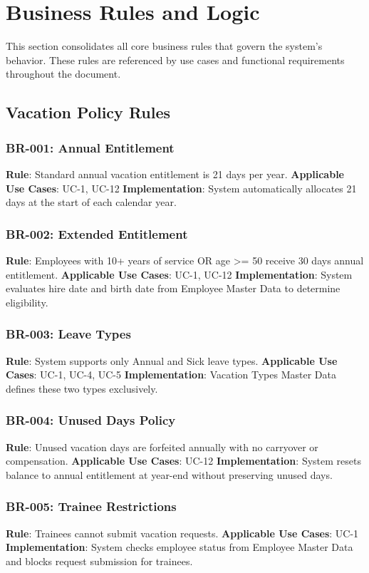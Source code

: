 \documentclass[12pt,a4paper]{article}
\begin{document}
\section{Business Rules and Logic}

This section consolidates all core business rules that govern the system's behavior. These rules are referenced by use cases and functional requirements throughout the document.

\subsection{Vacation Policy Rules}

\subsubsection{BR-001: Annual Entitlement}
\textbf{Rule}: Standard annual vacation entitlement is 21 days per year.
\textbf{Applicable Use Cases}: UC-1, UC-12
\textbf{Implementation}: System automatically allocates 21 days at the start of each calendar year.

\subsubsection{BR-002: Extended Entitlement}
\textbf{Rule}: Employees with 10+ years of service OR age >= 50 receive 30 days annual entitlement.
\textbf{Applicable Use Cases}: UC-1, UC-12
\textbf{Implementation}: System evaluates hire date and birth date from Employee Master Data to determine eligibility.

\subsubsection{BR-003: Leave Types}
\textbf{Rule}: System supports only Annual and Sick leave types.
\textbf{Applicable Use Cases}: UC-1, UC-4, UC-5
\textbf{Implementation}: Vacation Types Master Data defines these two types exclusively.

\subsubsection{BR-004: Unused Days Policy}
\textbf{Rule}: Unused vacation days are forfeited annually with no carryover or compensation.
\textbf{Applicable Use Cases}: UC-12
\textbf{Implementation}: System resets balance to annual entitlement at year-end without preserving unused days.

\subsubsection{BR-005: Trainee Restrictions}
\textbf{Rule}: Trainees cannot submit vacation requests.
\textbf{Applicable Use Cases}: UC-1
\textbf{Implementation}: System checks employee status from Employee Master Data and blocks request submission for trainees.
\end{document}
